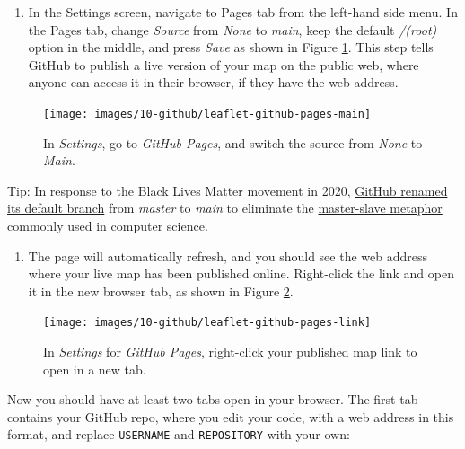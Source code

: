 \documentclass[
  english,
]{book}
\providecommand{\tightlist}{%
  \setlength{\itemsep}{0pt}\setlength{\parskip}{0pt}}
\begin{document}
\begin{enumerate}
\def\labelenumi{\arabic{enumi}.}
\setcounter{enumi}{9}
\tightlist
\item
  In the Settings screen, navigate to Pages tab from the left-hand side menu. In the Pages tab, change \emph{Source} from \emph{None} to \emph{main}, keep the default \emph{/(root)} option in the middle, and press \emph{Save} as shown in Figure \ref{fig:leaflet-github-pages-main}. This step tells GitHub to publish a live version of your map on the public web, where anyone can access it in their browser, if they have the web address.
\end{enumerate}



\begin{figure}
\texttt{[image: images/10-github/leaflet-github-pages-main]} \caption{In \emph{Settings}, go to \emph{GitHub Pages}, and switch the source from \emph{None} to \emph{Main}.}\label{fig:leaflet-github-pages-main}
\end{figure}

Tip: In response to the Black Lives Matter movement in 2020, \href{https://github.com/github/renaming}{GitHub renamed its default branch} from \emph{master} to \emph{main} to eliminate the \href{https://en.wikipedia.org/wiki/Master/slave_\%28technology\%29}{master-slave metaphor} commonly used in computer science.

\begin{enumerate}
\def\labelenumi{\arabic{enumi}.}
\setcounter{enumi}{10}
\tightlist
\item
  The page will automatically refresh, and you should see the web address where your live map has been published online. Right-click the link and open it in the new browser tab, as shown in Figure \ref{fig:leaflet-github-pages-link}.
\end{enumerate}



\begin{figure}
\texttt{[image: images/10-github/leaflet-github-pages-link]} \caption{In \emph{Settings} for \emph{GitHub Pages}, right-click your published map link to open in a new tab.}\label{fig:leaflet-github-pages-link}
\end{figure}

Now you should have at least two tabs open in your browser. The first tab contains your GitHub repo, where you edit your code, with a web address in this format, and replace \texttt{USERNAME} and \texttt{REPOSITORY} with your own:
\end{document}
